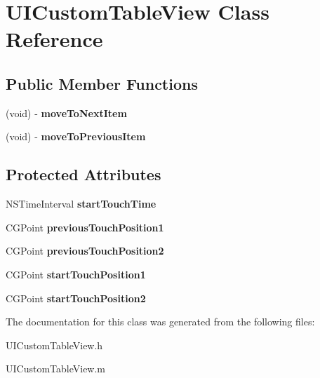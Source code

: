 \hypertarget{interface_u_i_custom_table_view}{
\section{UICustomTableView Class Reference}
\label{interface_u_i_custom_table_view}
}
\subsection*{Public Member Functions}
\begin{DoxyCompactItemize}
\item 
\hypertarget{interface_u_i_custom_table_view_a896b877957ec6027047c25278c0e656a}{
(void) -\/ {\bfseries moveToNextItem}}
\label{interface_u_i_custom_table_view_a896b877957ec6027047c25278c0e656a}

\item 
\hypertarget{interface_u_i_custom_table_view_a95b1202ecb567eb6be1dc42362b94c79}{
(void) -\/ {\bfseries moveToPreviousItem}}
\label{interface_u_i_custom_table_view_a95b1202ecb567eb6be1dc42362b94c79}

\end{DoxyCompactItemize}
\subsection*{Protected Attributes}
\begin{DoxyCompactItemize}
\item 
\hypertarget{interface_u_i_custom_table_view_a224c62b203fc48a53bc3d8195d13abcc}{
NSTimeInterval {\bfseries startTouchTime}}
\label{interface_u_i_custom_table_view_a224c62b203fc48a53bc3d8195d13abcc}

\item 
\hypertarget{interface_u_i_custom_table_view_a785d37ec1b2aad2d3ca1c2e598a1c98e}{
CGPoint {\bfseries previousTouchPosition1}}
\label{interface_u_i_custom_table_view_a785d37ec1b2aad2d3ca1c2e598a1c98e}

\item 
\hypertarget{interface_u_i_custom_table_view_acabe09e1357f0ce489c53712f50def72}{
CGPoint {\bfseries previousTouchPosition2}}
\label{interface_u_i_custom_table_view_acabe09e1357f0ce489c53712f50def72}

\item 
\hypertarget{interface_u_i_custom_table_view_a7457ce9f0d5b5c88d6924948555ecafe}{
CGPoint {\bfseries startTouchPosition1}}
\label{interface_u_i_custom_table_view_a7457ce9f0d5b5c88d6924948555ecafe}

\item 
\hypertarget{interface_u_i_custom_table_view_a4919217fe0d1e49aa59b216814f2af05}{
CGPoint {\bfseries startTouchPosition2}}
\label{interface_u_i_custom_table_view_a4919217fe0d1e49aa59b216814f2af05}

\end{DoxyCompactItemize}


The documentation for this class was generated from the following files:\begin{DoxyCompactItemize}
\item 
UICustomTableView.h\item 
UICustomTableView.m\end{DoxyCompactItemize}
